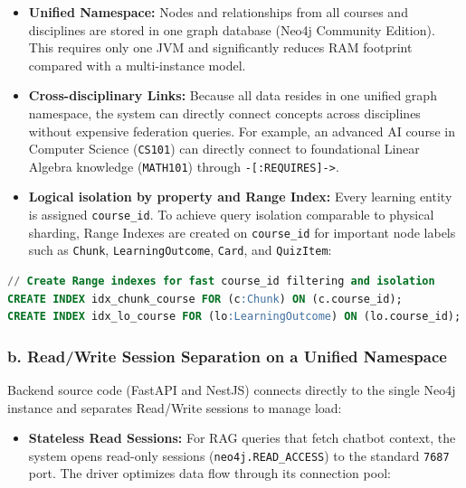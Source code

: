 \begin{itemize}
    \item \textbf{Unified Namespace:} Nodes and relationships from all
          courses and disciplines are stored in one graph database (Neo4j
          Community Edition). This requires only one JVM and significantly
          reduces RAM footprint compared with a multi-instance model.
    \item \textbf{Cross-disciplinary Links:} Because all data resides in
          one unified graph namespace, the system can directly connect
          concepts across disciplines without expensive federation
          queries. For example, an advanced AI course in Computer Science
          (\texttt{CS101}) can directly connect to foundational Linear
          Algebra knowledge (\texttt{MATH101}) through
          \texttt{-[:REQUIRES]->}.
    \item \textbf{Logical isolation by property and Range Index:} Every
          learning entity is assigned \texttt{course\_id}. To achieve
          query isolation comparable to physical sharding, Range Indexes
          are created on \texttt{course\_id} for important node labels
          such as \texttt{Chunk}, \texttt{LearningOutcome},
          \texttt{Card}, and \texttt{QuizItem}:
\end{itemize}

\begin{lstlisting}[language=SQL, caption=Initialize Range Indexes in Neo4j 5]
// Create Range indexes for fast course_id filtering and isolation
CREATE INDEX idx_chunk_course FOR (c:Chunk) ON (c.course_id);
CREATE INDEX idx_lo_course FOR (lo:LearningOutcome) ON (lo.course_id);
\end{lstlisting}

\subsubsection*{b. Read/Write Session Separation on a Unified Namespace}

Backend source code (FastAPI and NestJS) connects directly to the single
Neo4j instance and separates Read/Write sessions to manage load:

\begin{itemize}
    \item \textbf{Stateless Read Sessions:} For RAG queries that fetch
          chatbot context, the system opens read-only sessions
          (\texttt{neo4j.READ\_ACCESS}) to the standard \texttt{7687}
          port. The driver optimizes data flow through its connection
          pool:
\end{itemize}

